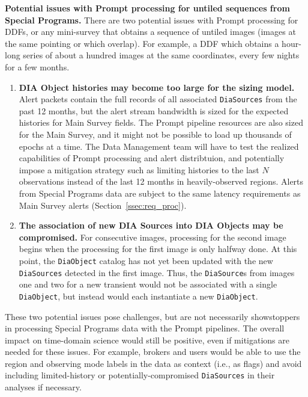 \textbf{Potential issues with Prompt processing for untiled sequences from Special Programs.}
There are two potential issues with Prompt processing for DDFs, or any mini-survey 
that obtains a sequence of untiled images (images at the same pointing or which overlap).
For example, a DDF which obtains a hour-long series of about a hundred images at the same coordinates,
every few nights for a few months.

\begin{enumerate}

\item \textbf{DIA Object histories may become too large for the sizing model.}
Alert packets contain the full records of all associated 
{\tt DiaSources} from the past 12 months, but the alert
stream bandwidth is sized for the expected histories for
Main Survey fields. 
The Prompt pipeline resources are also sized for the
Main Survey, and it might not be possible to load up
thousands of epochs at a time.
The Data Management team will have to test the realized
capabilities of Prompt processing and alert distribtuion,
and potentially impose a mitigation strategy such as
limiting histories to the last $N$ observations instead
of the last 12 months in heavily-observed regions.
Alerts from Special Programs data are subject to the same latency
requirements as Main Survey alerts (Section~\ref{ssec:req_proc}).

\item \textbf{The association of new DIA Sources into DIA Objects may be compromised.}
For consecutive images, processing for the second image begins when the processing for the 
first image is only halfway done.
At this point, the {\tt DiaObject} catalog has 
not yet been updated with the new {\tt DiaSources} detected in the first image.
Thus, the {\tt DiaSource}s from images one and two for a new transient 
would not be associated with a single {\tt DiaObject}, but instead would 
each instantiate a new {\tt DiaObject}.

\end{enumerate}

These two potential issues pose challenges, but are not necessarily showstoppers 
in processing Special Programs data with the Prompt pipelines. 
The overall impact on time-domain science would still be positive, even 
if mitigations are needed for these issues.
For example, brokers and users would be able to use the region and observing mode 
labels in the data as context (i.e., as flags) and avoid including 
limited-history or potentially-compromised {\tt DiaSources} in their
analyses if necessary.

